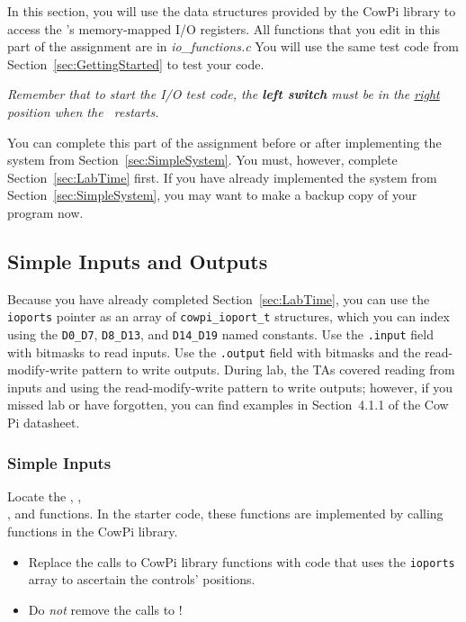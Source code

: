 In this section, you will use the data structures provided by the CowPi library to access the \developmentboard's memory-mapped I/O registers.
All functions that you edit in this part of the assignment are in \textit{io\_functions.c}
You will use the same test code from Section~\ref{sec:GettingStarted} to test your code.

\textit{Remember that to start the I/O test code, the \textbf{left switch} must be in the \underline{right} position when the \developmentboard\ restarts.}

You can complete this part of the assignment before or after implementing the system from Section~\ref{sec:SimpleSystem}.
You must, however, complete Section~\ref{sec:LabTime} first.
If you have already implemented the system from Section~\ref{sec:SimpleSystem}, you may want to make a backup copy of your program now.


\subsection{Simple Inputs and Outputs} \label{subsec:simpleIO}

Because you have already completed Section~\ref{sec:LabTime}, you can use the \lstinline{ioports} pointer as an array of \lstinline{cowpi_ioport_t} structures, which you can index using the \lstinline{D0_D7}, \lstinline{D8_D13}, and \lstinline{D14_D19} named constants.
Use the \lstinline{.input} field with bitmasks to read inputs.
Use the \lstinline{.output} field with bitmasks and the read-modify-write pattern to write outputs.
During lab, the TAs covered reading from inputs and using the read-modify-write pattern to write outputs;
however, if you missed lab or have forgotten, you can find examples in Section~4.1.1 of the Cow Pi datasheet.

\subsubsection{Simple Inputs}

Locate the , , \\ , and   functions.
In the starter code, these functions are implemented by calling functions in the CowPi library.

\begin{itemize}
    \item Replace the calls to CowPi library functions with code that uses the \lstinline{ioports} array to ascertain the controls' positions.
    \item Do \textit{not} remove the calls to !
\end{itemize}


